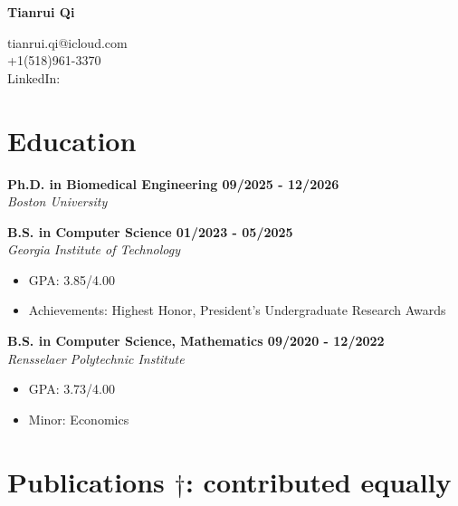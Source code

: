 \documentclass[letterpaper, 11pt]{article}
\newcommand{\subsectionvspace}{\vspace{8pt}}
\begin{document}
\begin{minipage}[t]{0.4\textwidth}
    \vspace*{0\baselineskip}\textbf{\Huge Tianrui Qi}
\end{minipage}%
\begin{minipage}[t]{0.6\textwidth}\raggedleft
    tianrui.qi@icloud.com 
    \\
    +1(518)961-3370
    \\
    LinkedIn: \href{https://www.linkedin.com/in/tianrui-qi/}{}
\end{minipage}


\section{Education}


    \textbf{Ph.D. in Biomedical Engineering \hfill 09/2025 - 12/2026} \\
    \textit{Boston University}

    \subsectionvspace

    \textbf{B.S. in Computer Science \hfill 01/2023 - 05/2025} \\
    \textit{Georgia Institute of Technology}
    \begin{itemize}
        \item GPA: 3.85/4.00
        \item Achievements: Highest Honor, President's Undergraduate Research Awards
    \end{itemize}

    \subsectionvspace

    \textbf{B.S. in Computer Science, Mathematics \hfill 09/2020 - 12/2022} \\
    \textit{Rensselaer Polytechnic Institute}
    \begin{itemize}
        \item GPA: 3.73/4.00
        \item Minor: Economics
    \end{itemize}


\section{Publications \hfill {\normalsize \normalfont $\dag$: contributed equally}}
\end{document}
